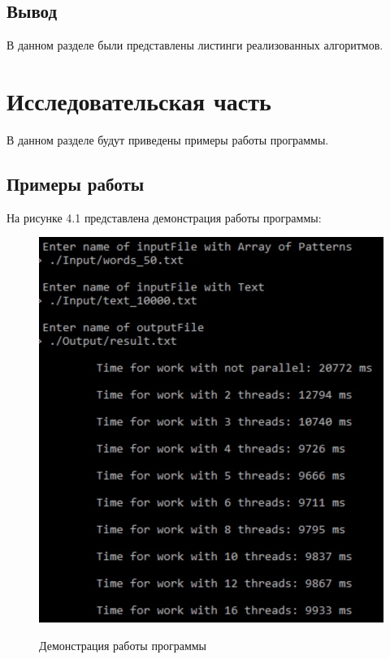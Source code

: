 \documentclass[a4paper, 14pt]{report}
\begin{document}
	\section{Вывод}

В данном разделе были представлены листинги реализованных алгоритмов.

\newpage
	\chapter{Исследовательская часть}
	В данном разделе будут приведены примеры работы программы.\\

	\section{Примеры работы}
	
На рисунке 4.1 представлена демонстрация работы программы:
	
	\begin{figure}[H]
        	\begin{center}
        		{\includegraphics[scale = 0.7]{img/example.png}}
        		\caption{Демонстрация работы программы}
        	\end{center}
        \end{figure}
\end{document}
